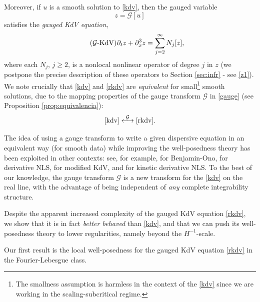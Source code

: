 \documentclass[%
11pt,  reqno]{amsart}
\newcommand{\5}{\textup{V}}
\newcommand{\jp}{\color{orange}}
\theoremstyle{remark}
\newcommand{\Gc}{\mathcal{G}}
\numberwithin{equation}{section}
\numberwithin{theorem}{section}
\begin{document}
    Moreover, if $u$ is a smooth solution to \eqref{kdv}, then the gauged variable
    \begin{equation}\label{defi_z_intro}
z=\mathcal{G}[u]
    \end{equation}
satisfies the \emph{gauged KdV equation},
\begin{equation}
\label{rkdv}\tag{$\Gc$-KdV}
\partial_t z+ \partial_x^3 z = 
\sum_{j=2}^\infty 
N_j[z]
,
	\end{equation}
	where each $N_j$, $j\ge 2$, is a nonlocal nonlinear  operator of degree $j$ in $z$ (we postpone the precise description of these operators to Section \ref{sec:infr} - see \eqref{z1}). \\
    
    We note crucially that \eqref{kdv} and \eqref{rkdv} are \textit{equivalent} for small\footnote{The smallness assumption is harmless in the context of the \eqref{kdv} since we are working in the scaling-subcritical regime.} smooth solutions, due to the mapping properties of the gauge transform $\Gc$ in \eqref{gauge} (see Proposition \ref{prop:equivalencia}):
    $$
\eqref{kdv} \overset{\Gc}{\longleftrightarrow} \eqref{rkdv}.
    $$
  


The idea of using a gauge transform to write a given dispersive equation in an equivalent way (for smooth data) while improving the well-posedness theory has been exploited in other contexts: see, for example,   \cite{IfrimTataru, MolinetPilod_bo, tao_bo} for Benjamin-Ono, \cite{CKSTT_dnls, Herr_dnls, takaoka_dnls} for derivative NLS, \cite{Chapouto_FL_mkdv} for modified KdV, and \cite{KishimotoTsutsumi_kdnls} for kinetic derivative NLS.
To {\jp the best of} our knowledge, the gauge transform $\Gc$ is a new transform for the \eqref{kdv} on the real line, with the advantage of being independent of \emph{any} complete integrability structure.

\medskip

  Despite the apparent increased complexity of the gauged KdV equation \eqref{rkdv}, we show that it is in fact \emph{better behaved} than \eqref{kdv}, and that we can push its well-posedness theory to lower regularities, namely beyond the $H^{-1}$-scale.

\medskip

 Our first result is the local well-posedness for the gauged KdV equation \eqref{rkdv} in the Fourier-Lebesgue class.
    
\end{document}
